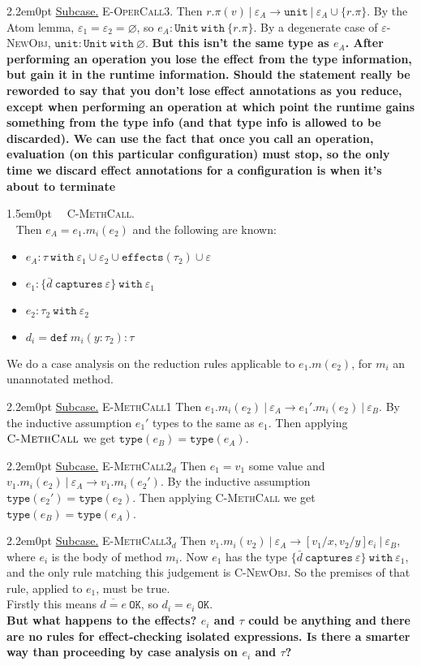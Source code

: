\documentclass{llncs}
\newcommand{\keywadj}[1]{\mathtt{#1}}
\newcommand{\keyw}[1]{\keywadj{#1}~}
\newcommand{\proofcase}[2]{
	\begin{adjustwidth}{1.5em}{0pt}
		\fbox{Case.}~~#1. \\ ~#2
	\end{adjustwidth}
}
\newcommand{\subcase}[1] {
	\begin{adjustwidth}{2.2em}{0pt}
		\underline{Subcase.} #1
	\end{adjustwidth}
}
\begin{document}
{{	\subcase{ \textsc{E-OperCall3}. Then $r.\pi(v)~|~\varepsilon_A \longrightarrow \keywadj{unit}~|~\varepsilon_A \cup \{ r.\pi \}$. By the Atom lemma, $\varepsilon_1 = \varepsilon_2 = \varnothing$, so $e_A : \keyw{Unit~with} \{ r.\pi \}$. By a degenerate case of \textsc{$\varepsilon$-NewObj}, $\keywadj{unit} : \keyw{Unit~with} \varnothing$. \textbf{But this isn't the same type as $e_A$. After performing an operation you lose the effect from the type information, but gain it in the runtime information. Should the statement really be reworded to say that you don't lose effect annotations as you reduce, except when performing an operation at which point the runtime gains something from the type info (and that type info is allowed to be discarded). We can use the fact that once you call an operation, evaluation (on this particular configuration) must stop, so the only time we discard effect annotations for a configuration is when it's about to terminate} \\}	
}
	
	\proofcase{\textsc{C-MethCall}} { Then $e_A = e_1.m_i(e_2)$ and the following are known:
	\begin{itemize}
		\item $e_A : \tau~\keyw{with} \varepsilon_1 \cup \varepsilon_2 \cup \keywadj{effects}(\tau_2) \cup \varepsilon$
		\item $e_1 : \{ \bar d~\keyw{captures} \varepsilon \}~\keyw{with} \varepsilon_1$
		\item $e_2 : \tau_2~\keyw{with} \varepsilon_2$
		\item $d_i = \keyw{def} m_i(y : \tau_2) : \tau$
	\end{itemize}
	
	We do a case analysis on the reduction rules applicable to $e_1.m(e_2)$, for $m_i$ an unannotated method.
	
	\subcase{ \textsc{E-MethCall1}
		Then $e_1.m_i(e_2)~|~\varepsilon_A \longrightarrow e_1'.m_i(e_2)~|~\varepsilon_B$. By the inductive assumption $e_1'$ types to the same as $e_1$. Then applying $\textsc{C-MethCall}$ we get $\keywadj{type}(e_B) = \keywadj{type}(e_A)$.
	}
	
	\subcase{ \textsc{E-MethCall2$_d$}
		Then $e_1 = v_1$ some value and $v_1.m_i(e_2)~|~\varepsilon_A \longrightarrow v_1.m_i(e_2')$. By the inductive assumption $\keywadj{type}(e_2') = \keywadj{type}(e_2)$. Then applying \textsc{C-MethCall} we get $\keywadj{type}(e_B) = \keywadj{type}(e_A)$.
	}		
	
	\subcase{ \textsc{E-MethCall3$_d$} Then $v_1.m_i(v_2)~|~\varepsilon_A \longrightarrow [v_1/x, v_2/y]e_i~|~\varepsilon_B$, where $e_i$ is the body of method $m_i$. Now $e_1$ has the type $\{ \bar d~\keyw{captures} \varepsilon \}~\keyw{with} \varepsilon_1$, and the only rule matching this judgement is \textsc{C-NewObj}. So the premises of that rule, applied to $e_1$, must be true.
	\\ \noindent
Firstly this means $\overline{d = e}~\keywadj{OK}$, so $d_i = e_i~\keywadj{OK}$.
	\\ \noindent
\textbf{But what happens to the effects? $e_i$ and $\tau$ could be anything and there are no rules for effect-checking isolated expressions. Is there a smarter way than proceeding by case analysis on $e_i$ and $\tau$?}
}
		
}}
\end{document}
